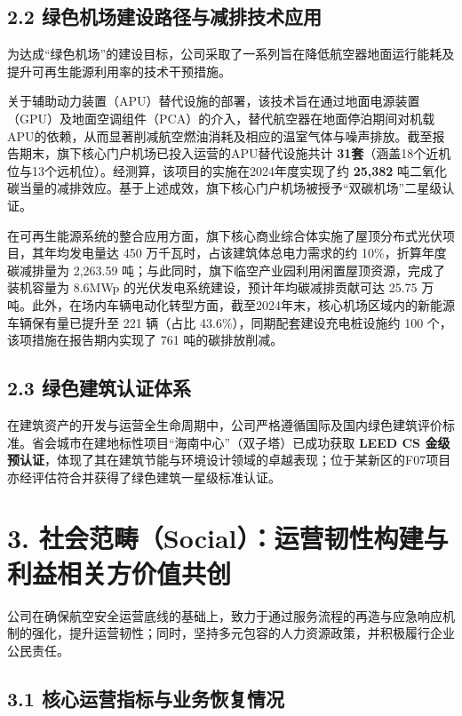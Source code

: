 \documentclass[a4paper,12pt]{article}
\begin{document}
\subsection{2.2 绿色机场建设路径与减排技术应用}

为达成“绿色机场”的建设目标，公司采取了一系列旨在降低航空器地面运行能耗及提升可再生能源利用率的技术干预措施。

关于辅助动力装置（APU）替代设施的部署，该技术旨在通过地面电源装置（GPU）及地面空调组件（PCA）的介入，替代航空器在地面停泊期间对机载APU的依赖，从而显著削减航空燃油消耗及相应的温室气体与噪声排放。截至报告期末，旗下核心门户机场已投入运营的APU替代设施共计 \textbf{31套}（涵盖18个近机位与13个远机位）。经测算，该项目的实施在2024年度实现了约 \textbf{25,382} 吨二氧化碳当量的减排效应。基于上述成效，旗下核心门户机场被授予“双碳机场”二星级认证。

在可再生能源系统的整合应用方面，旗下核心商业综合体实施了屋顶分布式光伏项目，其年均发电量达 450 万千瓦时，占该建筑体总电力需求的约 10\%，折算年度碳减排量为 2,263.59 吨；与此同时，旗下临空产业园利用闲置屋顶资源，完成了装机容量为 8.6MWp 的光伏发电系统建设，预计年均碳减排贡献可达 25.75 万吨。此外，在场内车辆电动化转型方面，截至2024年末，核心机场区域内的新能源车辆保有量已提升至 221 辆（占比 43.6\%），同期配套建设充电桩设施约 100 个，该项措施在报告期内实现了 761 吨的碳排放削减。

\subsection{2.3 绿色建筑认证体系}

在建筑资产的开发与运营全生命周期中，公司严格遵循国际及国内绿色建筑评价标准。省会城市在建地标性项目“海南中心”（双子塔）已成功获取 \textbf{LEED CS 金级预认证}，体现了其在建筑节能与环境设计领域的卓越表现；位于某新区的F07项目亦经评估符合并获得了绿色建筑一星级标准认证。

\section{3. 社会范畴（Social）：运营韧性构建与利益相关方价值共创}

公司在确保航空安全运营底线的基础上，致力于通过服务流程的再造与应急响应机制的强化，提升运营韧性；同时，坚持多元包容的人力资源政策，并积极履行企业公民责任。

\subsection{3.1 核心运营指标与业务恢复情况}
\end{document}
